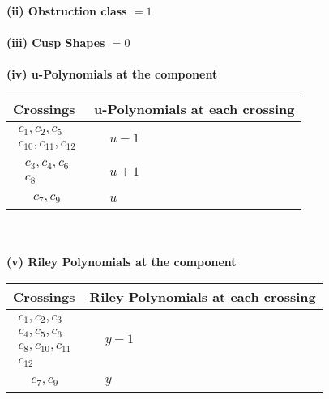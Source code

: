 \documentclass[1p]{elsarticle_modified}
\theoremstyle{definition}
\begin{document}
\flushleft \textbf{(ii) Obstruction class $= 1$}\\~\\
\flushleft \textbf{(iii) Cusp Shapes $= 0$}\\~\\
\newpage\renewcommand{\arraystretch}{1}
\flushleft \textbf{(iv) u-Polynomials at the component}\newline \\
\begin{tabular}{m{50pt}|m{274pt}}
Crossings & \hspace{64pt}u-Polynomials at each crossing \\
\hline $$\begin{aligned}c_{1},c_{2},c_{5}\\c_{10},c_{11},c_{12}\end{aligned}$$&$\begin{aligned}
&u-1
\end{aligned}$\\
\hline $$\begin{aligned}c_{3},c_{4},c_{6}\\c_{8}\end{aligned}$$&$\begin{aligned}
&u+1
\end{aligned}$\\
\hline $$\begin{aligned}c_{7},c_{9}\end{aligned}$$&$\begin{aligned}
&u
\end{aligned}$\\
\hline
\end{tabular}\\~\\
\newpage\renewcommand{\arraystretch}{1}
\flushleft \textbf{(v) Riley Polynomials at the component}\newline \\
\begin{tabular}{m{50pt}|m{274pt}}
Crossings & \hspace{64pt}Riley Polynomials at each crossing \\
\hline $$\begin{aligned}c_{1},c_{2},c_{3}\\c_{4},c_{5},c_{6}\\c_{8},c_{10},c_{11}\\c_{12}\end{aligned}$$&$\begin{aligned}
&y-1
\end{aligned}$\\
\hline $$\begin{aligned}c_{7},c_{9}\end{aligned}$$&$\begin{aligned}
&y
\end{aligned}$\\
\hline
\end{tabular}\\~\\
\end{document}
